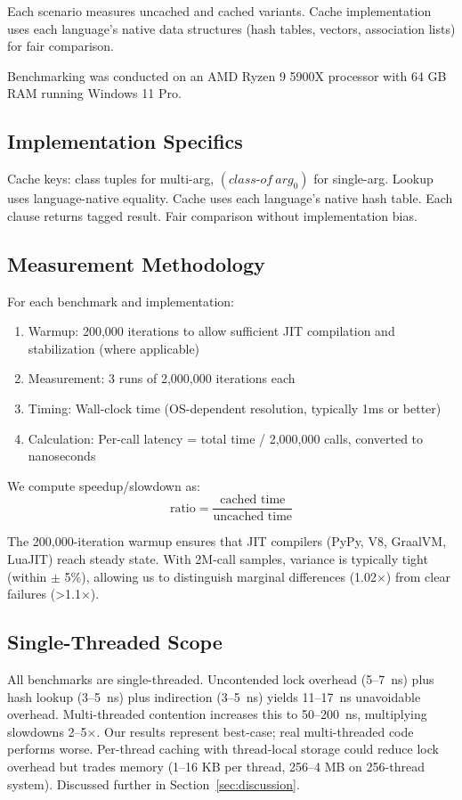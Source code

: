 \documentclass[sigplan,final,acmsmall,review,screen]{acmart}
\begin{document}
Each scenario measures uncached and cached variants. Cache implementation uses each
language's native data structures (hash tables, vectors, association lists) for fair comparison.

Benchmarking was conducted on
an AMD Ryzen 9 5900X processor with 64 GB RAM running Windows 11 Pro.

\subsection{Implementation Specifics}

Cache keys: class tuples for multi-arg, $(class\text{-}of~arg_0)$ for single-arg. Lookup uses language-native equality. Cache uses each language's native hash table. Each clause returns tagged result. Fair comparison without implementation bias.

\subsection{Measurement Methodology}

For each benchmark and implementation:
\begin{enumerate}
  \item Warmup: 200,000 iterations to allow sufficient JIT compilation and stabilization (where applicable)
  \item Measurement: 3 runs of 2,000,000 iterations each
  \item Timing: Wall-clock time (OS-dependent resolution, typically 1ms or better)
  \item Calculation: Per-call latency = total time / 2,000,000 calls, converted to nanoseconds
\end{enumerate}

We compute speedup/slowdown as:
\[
\text{ratio} = \frac{\text{cached time}}{\text{uncached time}}
\]

The 200,000-iteration warmup ensures that JIT compilers (PyPy, V8, GraalVM, LuaJIT) reach steady state.
With 2M-call samples, variance is typically tight (within $\pm$ 5\%), allowing us to distinguish marginal differences
(1.02×) from clear failures (>1.1×).

\subsection{Single-Threaded Scope}
\label{sec:threading}

All benchmarks are single-threaded. Uncontended lock overhead (5--7~ns) plus hash lookup (3--5~ns) plus indirection (3--5~ns) yields 11--17~ns unavoidable overhead. Multi-threaded contention increases this to 50--200~ns, multiplying slowdowns 2--5×. Our results represent best-case; real multi-threaded code performs worse. Per-thread caching with thread-local storage could reduce lock overhead but trades memory (1--16 KB per thread, 256--4 MB on 256-thread system). Discussed further in Section~\ref{sec:discussion}.
\end{document}
